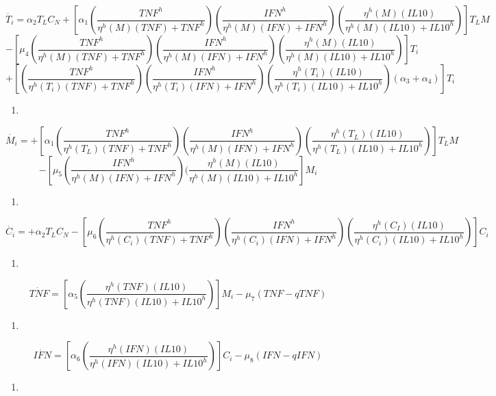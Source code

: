 \documentclass[
]{article}
\providecommand{\tightlist}{%
  \setlength{\itemsep}{0pt}\setlength{\parskip}{0pt}}
\begin{document}
\[ \dot{T_{i}}=\alpha_{2}T_{L}C_{N}+[\alpha_{1}(\dfrac{TNF^{h}}{\eta^{h}(M)(TNF)+ TNF^{h}})(\dfrac{IFN^{h}}{\eta^{h}(M)(IFN)+IFN^{h}})(\dfrac{\eta^{h}(M)(IL10)}{\eta^{h}(M)(IL10)+IL10^{h}})]T_{L}M  \]
\[-[\mu_{4}(\dfrac{TNF^{h}}{\eta^{h}(M)(TNF)+TNF^{h}})(\dfrac{IFN^{h}}{\eta^{h}(M)(IFN)+IFN^{h}})(\dfrac{\eta^{h}(M)(IL10)}{\eta^{h}(M)(IL10)+IL10^{h}})]T_{i} \]
\[+[(\dfrac{TNF^{h}}{\eta^{h}(T_{i})(TNF)+TNF^{h}})(\dfrac{IFN^{h}}{\eta^{h}(T_{i})(IFN)+IFN^{h}})(\dfrac{\eta^{h}(T_{i})(IL10)}{\eta^{h}(T_{i})(IL10)+IL10^{h}})(\alpha_{3}+\alpha_{4})]T_{i}  \]

\begin{enumerate}
\def\labelenumi{\arabic{enumi}.}
\setcounter{enumi}{4}
\tightlist
\item
\end{enumerate}

\[ \dot{M_{i}}= +[\alpha_{1}(\dfrac{TNF^{h}}{\eta^{h}(T_{L})(TNF)+TNF^{h}})(\dfrac{IFN^{h}}{\eta^{h}(M)(IFN)+IFN^{h}})(\dfrac{\eta^{h}(T_{L})(IL10)}{\eta^{h}(T_{L})(IL10)+IL10^{h}})]T_{L}M   \]
\[-[\mu_{5}(\dfrac{IFN^{h}}{\eta^{h}(M)(IFN)+IFN^{h}})(\dfrac{\eta^{h}(M)(IL10)}{\eta^{h}(M)(IL10)+IL10^{h}}]M_{i}  \]

\begin{enumerate}
\def\labelenumi{\arabic{enumi}.}
\setcounter{enumi}{5}
\tightlist
\item
\end{enumerate}

\[ \dot{C_{i}}= +\alpha_{2}T_{L}C_{N}- [\mu_{6}(\dfrac{TNF^{h}}{\eta^{h}(C_{i})(TNF)+TNF^{h}})(\dfrac{IFN^{h}}{\eta^{h}(C_{i})(IFN)+IFN^{h}})(\dfrac{\eta^{h}(C_{I})(IL10)}{\eta^{h}(C_{i})(IL10)+IL10^{h}})]C_{i} \]

\begin{enumerate}
\def\labelenumi{\arabic{enumi}.}
\setcounter{enumi}{6}
\tightlist
\item
\end{enumerate}

\[\dot{TNF}= [\alpha_{5}(\dfrac{\eta^{h}(TNF)(IL10)}{\eta^{h}(TNF)(IL10)+IL10^{h}})]M_{i} -\mu_{7}(TNF -qTNF)\]

\begin{enumerate}
\def\labelenumi{\arabic{enumi}.}
\setcounter{enumi}{7}
\tightlist
\item
\end{enumerate}

\[ \dot{IFN}=  [\alpha_{6}(\dfrac{\eta^{h}(IFN)(IL10)}{\eta^{h}(IFN)(IL10)+IL10^{h}})]C_{i}-\mu_{8}(IFN-qIFN) \]

\begin{enumerate}
\def\labelenumi{\arabic{enumi}.}
\setcounter{enumi}{8}
\tightlist
\item
\end{enumerate}
\end{document}
